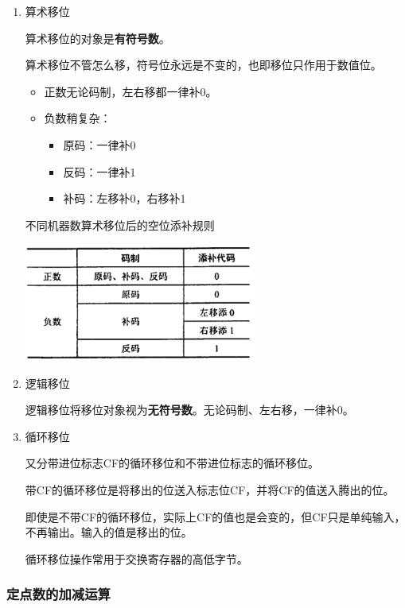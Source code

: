 \documentclass[12pt, a4paper, oneside]{ctexart}
\begin{document}
\begin{enumerate}
  \item {\kaishu 算术移位}
  
  算术移位的对象是\textbf{有符号数}。

  算术移位不管怎么移，符号位永远是不变的，也即移位只作用于数值位。

  \begin{itemize}
    \item 正数无论码制，左右移都一律补0。
    \item 负数稍复杂：
    \begin{itemize}
      \item 原码：一律补0
      \item 反码：一律补1
      \item 补码：左移补0，右移补1
    \end{itemize}
  \end{itemize}

  \begin{table}[!ht]
    \centering
    \caption{不同机器数算术移位后的空位添补规则}
    \includegraphics[width=0.6\textwidth]{./images/shift_rule.png}
  \end{table}
  \item {\kaishu 逻辑移位}
  
  逻辑移位将移位对象视为\textbf{无符号数}。无论码制、左右移，一律补0。
  \item {\kaishu 循环移位}
  
  又分带进位标志CF的循环移位和不带进位标志的循环移位。

  带CF的循环移位是将移出的位送入标志位CF，并将CF的值送入腾出的位。

  即使是不带CF的循环移位，实际上CF的值也是会变的，但CF只是单纯输入，不再输出。输入的值是移出的位。

  循环移位操作常用于交换寄存器的高低字节。
\end{enumerate}

\subsubsection{定点数的加减运算}
\end{document}
